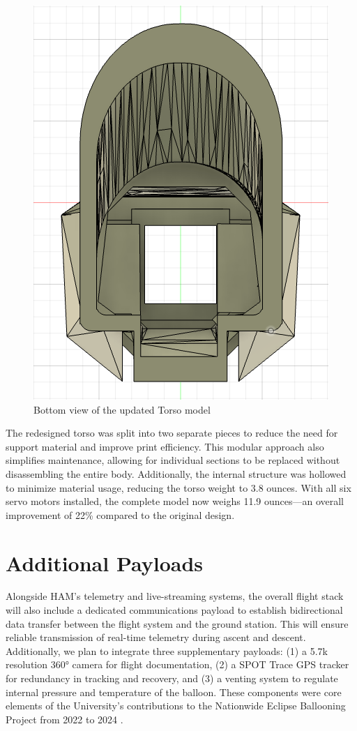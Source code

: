 \begin{figure}[H]
    \centering
    \includegraphics[width=0.24 \textwidth]{Figures/Model_Bottom_View.png}
    \caption{Bottom view of the updated Torso model}
    \label{Fig:Model_Bottom}
\end{figure}
\vspace{-2em}

The redesigned torso was split into two separate pieces to reduce the need for support material and improve print efficiency. This modular approach also simplifies maintenance, allowing for individual sections to be replaced without disassembling the entire body. Additionally, the internal structure was hollowed to minimize material usage, reducing the torso weight to 3.8 ounces. With all six servo motors installed, the complete model now weighs 11.9 ounces—an overall improvement of 22\% compared to the original design. \par

\vspace{-2em}  %
\section{Additional Payloads}
\vspace{-2em}  %

Alongside HAM’s telemetry and live-streaming systems, the overall flight stack will also include a dedicated communications payload to establish bidirectional data transfer between the flight system and the ground station. This will ensure reliable transmission of real-time telemetry during ascent and descent. Additionally,  we plan to integrate three supplementary payloads: (1) a 5.7k resolution 360° camera for flight documentation, (2) a SPOT Trace GPS tracker for redundancy in tracking and recovery, and (3) a venting system to regulate internal pressure and temperature of the balloon. These components were core elements of the University’s contributions to the Nationwide Eclipse Ballooning Project from 2022 to 2024 \cite{NEBP_Website}.